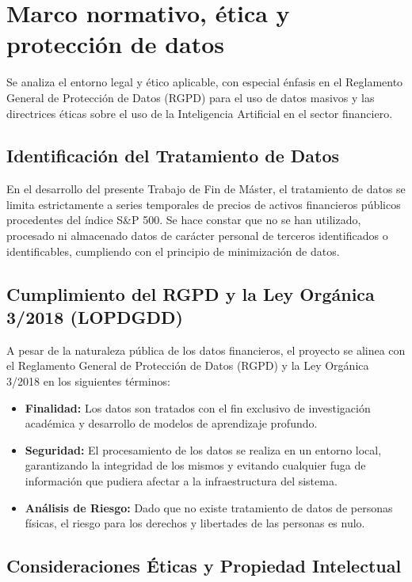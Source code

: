 \clearpage
\chapter{Marco normativo, ética y protección de datos}

Se analiza el entorno legal y ético aplicable, con especial énfasis en el Reglamento General de Protección de Datos (RGPD) para el uso de datos masivos y las directrices éticas sobre el uso de la Inteligencia Artificial en el sector financiero.

\section{Identificación del Tratamiento de Datos}

En el desarrollo del presente Trabajo de Fin de Máster, el tratamiento de datos se limita estrictamente a series temporales de precios de activos financieros públicos procedentes del índice S\&P 500. Se hace constar que no se han utilizado, procesado ni almacenado datos de carácter personal de terceros identificados o identificables, cumpliendo con el principio de minimización de datos.

\section{Cumplimiento del RGPD y la Ley Orgánica 3/2018 (LOPDGDD)}

A pesar de la naturaleza pública de los datos financieros, el proyecto se alinea con el Reglamento General de Protección de Datos (RGPD) y la Ley Orgánica 3/2018 en los siguientes términos:

\begin{itemize}
    \item \textbf{Finalidad:} Los datos son tratados con el fin exclusivo de investigación académica y desarrollo de modelos de aprendizaje profundo.
    \item \textbf{Seguridad:} El procesamiento de los datos se realiza en un entorno local, garantizando la integridad de los mismos y evitando cualquier fuga de información que pudiera afectar a la infraestructura del sistema.
    \item \textbf{Análisis de Riesgo:} Dado que no existe tratamiento de datos de personas físicas, el riesgo para los derechos y libertades de las personas es nulo.
\end{itemize}

\section{Consideraciones Éticas y Propiedad Intelectual}

